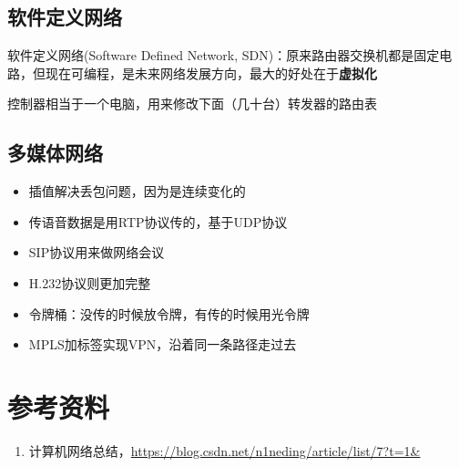 \subsection{软件定义网络}
软件定义网络(Software Defined Network, SDN)：原来路由器交换机都是固定电路，但现在可编程，是未来网络发展方向，最大的好处在于\textbf{虚拟化}

\begin{center}
\end{center}

控制器相当于一个电脑，用来修改下面（几十台）转发器的路由表

\subsection{多媒体网络}
\begin{itemize}
\item 插值解决丢包问题，因为是连续变化的
\item 传语音数据是用RTP协议传的，基于UDP协议
\item SIP协议用来做网络会议
\item H.232协议则更加完整
\item 令牌桶：没传的时候放令牌，有传的时候用光令牌
\item MPLS加标签实现VPN，沿着同一条路径走过去
\end{itemize}

\section{参考资料}
\begin{enumerate}
\item 计算机网络总结，\url{https://blog.csdn.net/n1neding/article/list/7?t=1&}
\end{enumerate}